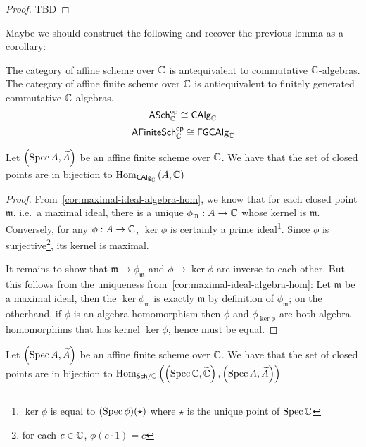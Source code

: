 \begin{proof}
  TBD %
\end{proof}

Maybe we should construct the following and recover the previous lemma as a corollary:
\begin{proposition}
  The category of affine scheme over $\mathbb{C}$ is antequivalent to commutative $\mathbb{C}$-algebras.
  The category of affine finite scheme over $\mathbb{C}$ is antiequivalent to finitely generated commutative $\mathbb{C}$-algebras.
  \[
    \mathsf{ASch}_{\mathbb{C}}^{\mathsf{op}}\cong \mathsf{CAlg}_{\mathbb{C}}
  \]
  \[
    \mathsf{AFiniteSch}_{\mathbb{C}}^{\mathsf{op}}\cong \mathsf{FGCAlg}_{\mathbb{C}}
  \]
\end{proposition}

\begin{proposition}\label{thm:affine-scheme-closed-points-biject-algebra-hom}
  Let $\left(\operatorname*{Spec}{A}, \widetilde{A}\right)$ be an affine finite scheme over $\mathbb{C}$. We have that the set of closed points are in bijection to
  $\operatorname{Hom}_{\mathsf{CAlg}_{\mathbb{C}}}\left(A, \mathbb{C}\right)$
\end{proposition}

\begin{proof}
  From~\cref{cor:maximal-ideal-algebra-hom}, we know that for each closed point $\mathfrak m$, i.e.\ a maximal ideal, there is a unique $\phi_{\mathfrak m} : A \to \mathbb{C}$ whose kernel is $\mathfrak m$. Conversely, for any $\phi: A \to \mathbb{C}$, $\ker \phi$ is certainly a prime ideal\footnote{$\ker \phi$ is equal to $(\operatorname{Spec} \phi)(\star)$ where $\star$ is the unique point of $\operatorname{Spec}\mathbb{C}$}. Since $\phi$ is surjective\footnote{for each $c \in \mathbb{C}$, $\phi(c \cdot 1) = c$}, its kernel is maximal.


  It remains to show that $\mathfrak m \mapsto \phi_{\mathfrak{m}}$ and $\phi \mapsto \ker \phi$ are inverse to each other. But this follows from the uniqueness from~\cref{cor:maximal-ideal-algebra-hom}:
  Let $\mathfrak{m}$ be a maximal ideal, then the $\ker \phi_{\mathfrak{m}}$ is exactly $\mathfrak m$ by definition of $\phi_{\mathfrak m}$;
  on the otherhand, if $\phi$ is an algebra homomorphism then $\phi$ and $\phi_{\ker \phi}$ are both algebra homomorphims that has kernel $\ker \phi$, hence must be equal.
\end{proof}

\begin{corollary}\label{cor:affine-closed-point-bijection-scheme-morphism}
  Let $\left(\operatorname*{Spec}{A}, \widetilde{A}\right)$ be an affine finite scheme over $\mathbb{C}$. We have that the set of closed points are in bijection to $\operatorname{Hom}_{\mathsf{Sch}/\mathbb{C}}{\left(\left(\operatorname*{Spec}{\mathbb{C}}, \widetilde{\mathbb{C}}\right), \left(\operatorname*{Spec}{A}, \widetilde{A}\right)\right)}$
\end{corollary}

